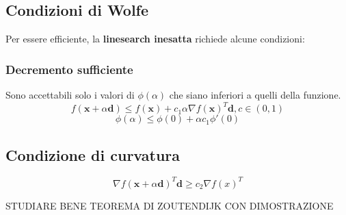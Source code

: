 \documentclass[\main/main.tex]{subfiles}
\begin{document}
\subsection{Condizioni di Wolfe}
Per essere efficiente, la \textbf{linesearch inesatta} richiede alcune condizioni:

\subsubsection{Decremento sufficiente}
Sono accettabili solo i valori di $\phi (\alpha)$ che siano inferiori a quelli della funzione.
\[
	f(\bm{x} + \alpha \bm{d}) \leq f(\bm{x}) + c_1\alpha \nabla f(\bm{x})^T \bm{d}, c \in (0,1) 
\]
\[
	\phi(\alpha) \leq \phi(0) + \alpha c_1 \phi' (0)
\]

\subsection{Condizione di curvatura}

\[
	\nabla f(\bm{x} + \alpha \bm{d})^T \bm{d} \geq c_2 \nabla f(x)^T
\]


STUDIARE BENE TEOREMA DI ZOUTENDIJK CON DIMOSTRAZIONE

\begin{center}
\end{center}
\end{document}
